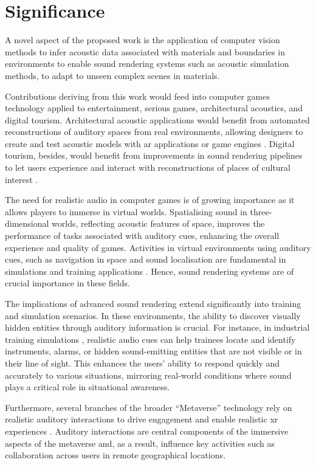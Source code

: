 \section{Significance}
A novel aspect of the proposed work is the application of computer vision methods to infer acoustic data associated with materials and boundaries in environments to enable sound rendering systems such as acoustic simulation methods, to adapt to unseen complex scenes in materials.\par
Contributions deriving from this work would feed into computer games technology applied to entertainment, serious games, architectural acoustics, and digital tourism. Architectural acoustic applications would benefit from automated reconstructions of auditory spaces from real environments, allowing designers to create and test acoustic models with \acrshort{ar} applications or game engines \citep{berardi2016acoustic}. Digital tourism, besides, would benefit from improvements in sound rendering pipelines to let users experience and interact with reconstructions of places of cultural interest \citep{schofield2018viking}.\par
The need for realistic audio in computer games is of growing importance as it allows players to immerse in virtual worlds. Spatialising sound in three-dimensional worlds, reflecting acoustic features of space, improves the performance of tasks associated with auditory cues, enhancing the overall experience and quality of games. Activities in virtual environments using auditory cues, such as navigation in space and sound localisation are fundamental in simulations and training applications \citep{lokki2005navigation}. Hence, sound rendering systems are of crucial importance in these fields.\par
The implications of advanced sound rendering extend significantly into training and simulation scenarios. In these environments, the ability to discover visually hidden entities through auditory information is crucial. For instance, in industrial training simulations \citep{machala2022application}, realistic audio cues can help trainees locate and identify instruments, alarms, or hidden sound-emitting entities that are not visible or in their line of sight. This enhances the users' ability to respond quickly and accurately to various situations, mirroring real-world conditions where sound plays a critical role in situational awareness.\par
Furthermore, several branches of the broader ``Metaverse'' technology rely on realistic auditory interactions to drive engagement and enable realistic \acrshort{xr} experiences \citep{park2022metaverse,al2022review}. Auditory interactions are central components of the immersive aspects of the metaverse and, as a result, influence key activities such as collaboration across users in remote geographical locations.\par

